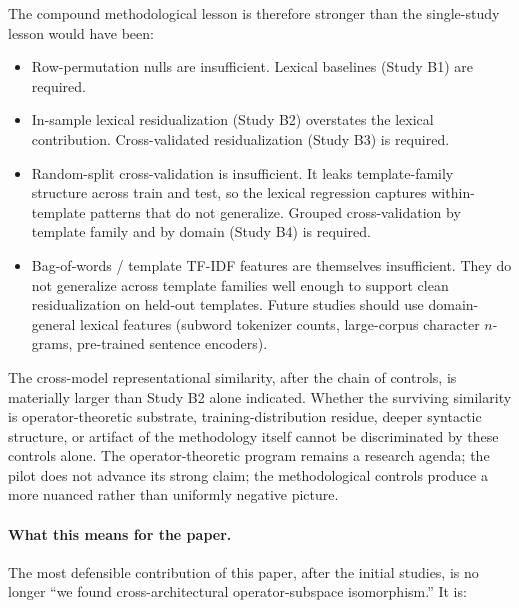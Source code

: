The compound methodological lesson is therefore stronger than the
single-study lesson would have been:

\begin{itemize}
    \item Row-permutation nulls are insufficient. Lexical baselines
        (Study B1) are required.
    \item In-sample lexical residualization (Study B2) overstates
        the lexical contribution. Cross-validated residualization
        (Study B3) is required.
    \item Random-split cross-validation is insufficient. It leaks
        template-family structure across train and test, so the
        lexical regression captures within-template patterns that
        do not generalize. Grouped cross-validation by template
        family and by domain (Study B4) is required.
    \item Bag-of-words / template TF-IDF features are themselves
        insufficient. They do not generalize across template
        families well enough to support clean residualization on
        held-out templates. Future studies should use
        domain-general lexical features (subword tokenizer counts,
        large-corpus character $n$-grams, pre-trained sentence
        encoders).
\end{itemize}

The cross-model representational similarity, after the chain of
controls, is materially larger than Study B2 alone indicated. Whether
the surviving similarity is operator-theoretic substrate,
training-distribution residue, deeper syntactic structure, or
artifact of the methodology itself cannot be discriminated by these
controls alone. The operator-theoretic program remains a research
agenda; the pilot does not advance its strong claim; the methodological
controls produce a more nuanced rather than uniformly negative
picture.

\paragraph{What this means for the paper.} The most defensible
contribution of this paper, after the initial studies, is no longer
``we found cross-architectural operator-subspace isomorphism.'' It is:

